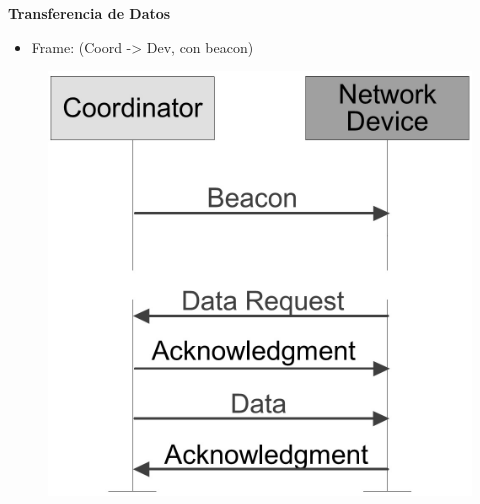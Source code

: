 \documentclass[aspectratio=169]{beamer}
\begin{document}
\begin{frame}{\textbf{Transferencia de Datos}}
\begin{minipage}[c]{1.0\linewidth}
	\begin{minipage}[c]{0.6\linewidth}
		\begin{itemize}
			\item Frame: (Coord -> Dev, con beacon)
			\vspace{10px}
	  	\end{itemize}	
	\end{minipage}
	\begin{minipage}[c]{0.35\linewidth}
		\begin{figure}[H]
			\includegraphics[width=1\textwidth]{./imagenes/coord-dev-beacon.jpg}
		\end{figure}	  	  	
	\end{minipage}
\end{minipage}
\end{frame}
\end{document}
